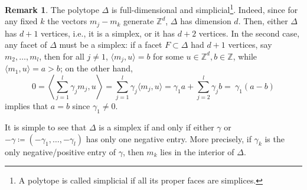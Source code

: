 \documentclass[11pt, reqno]{amsart}
\theoremstyle{plain}
\theoremstyle{definition}
\newtheorem{rem}[thm]{Remark}
\newcommand{\ZZ}{\mathbb{Z}}
\newcommand{\ga}{\gamma}
\begin{document}
\begin{rem}
\label{rem:mj-polytope}
The polytope $\Delta$ is full-dimensional and simplicial\footnote{A polytope is called simplicial if all its proper faces are simplices.}. 
Indeed, since for any fixed $k$ the vectors $m_j-m_{k}$ generate $\ZZ^d$, $\Delta$ has dimension $d$. Then, either $\Delta$ has $d+1$ vertices, i.e., it is a simplex, or it has $d+2$ vertices. In the second case, any facet of $\Delta$ must be a simplex: if a facet $F \subset \Delta$ had $d+1$ vertices, say $m_2, \dots, m_l$, then  for all $j \neq 1$,  $\langle m_j, u\rangle =b$ for some $u \in \ZZ^d, b \in \ZZ$, while $\langle m_1, u\rangle =a>b$; on the other hand, 
\[
0=\left\langle \sum_{j=1}^l \gamma_j m_j, u \right\rangle =\sum_{j=1}^l \gamma_j \langle m_j, u \rangle=  \gamma_1a+\sum_{j=2}^l \gamma_j b   = \ \gamma_1 (a -b)
\] 
implies that $a=b$ since $\ga_1 \neq 0$. 

It is simple to see that $\Delta$ is a simplex if and only if either $\gamma$ or $-\gamma\coloneqq (-\gamma_1, \dots, -\gamma_l)$  has only one negative entry. More precisely, if $\gamma_k$ is the only negative/positive entry of $\gamma$, then $m_k$ lies in the interior of $\Delta$. 
\end{rem}
\end{document}
